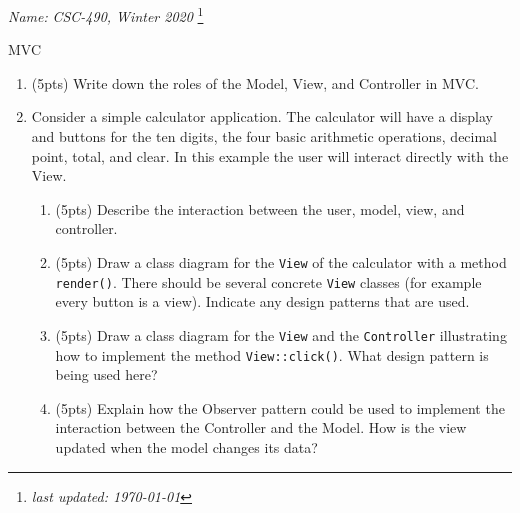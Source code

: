 \documentclass[11pt]{article}
\newlength{\up}\setlength{\up}{-\baselineskip}
\newcommand\blfootnote[1]{%
  \begingroup
  \renewcommand\thefootnote{}\footnote{#1}%
  \addtocounter{footnote}{-1}%
  \endgroup
}
\begin{document}
\noindent\emph{Name:}
\hfill
\emph{CSC-490, Winter 2020}
\blfootnote{\emph{last updated: \today}}

\vspace{-0.4in}

\begin{center}
  {\huge MVC}
\end{center}

\medskip




\begin{enumerate}

    \item (5pts) Write down the roles of the Model, View, and Controller in MVC.

    \vspace{1in}

    \item Consider a simple calculator application. The calculator will have a display and buttons for the ten digits, the four basic arithmetic operations, decimal point, total, and clear. In this example the user will interact directly with the View. 

    \begin{enumerate}

      \item (5pts) Describe the interaction between the user, model, view, and controller.

      \vfill

      \item (5pts) Draw a class diagram for the \texttt{View} of the calculator with a method \texttt{render()}. There should be several concrete \texttt{View} classes (for example every button is a view). Indicate any design patterns that are used. 

      \vfill
      \vfill

      \item (5pts) Draw a class diagram for the \texttt{View} and the \texttt{Controller} illustrating how to implement the method \texttt{View::click()}. What design pattern is being used here?

      \vfill
      \vfill

\newpage

      \item (5pts) Explain how the Observer pattern could be used to implement the interaction between the Controller and the Model. How is the view updated when the model changes its data?


\end{enumerate}
\end{enumerate}
\end{document}
